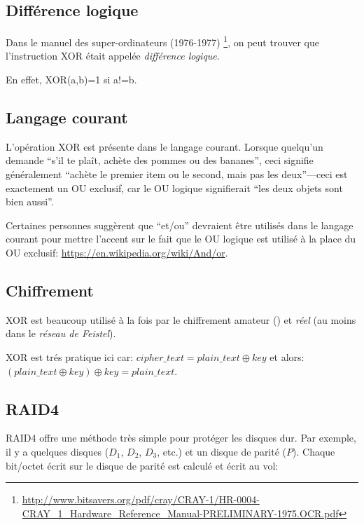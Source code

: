 ﻿
\label{XOR_property}



\subsection{Différence logique}

Dans le manuel des super-ordinateurs (1976-1977)
\footnote{\url{http://www.bitsavers.org/pdf/cray/CRAY-1/HR-0004-CRAY_1_Hardware_Reference_Manual-PRELIMINARY-1975.OCR.pdf}},
on peut trouver que l'instruction XOR était appelée \emph{différence logique}.

En effet, XOR(a,b)=1 si a!=b.

\subsection{Langage courant}

L'opération XOR est présente dans le langage courant.
Lorsque quelqu'un demande ``s'il te plaît, achète des pommes ou des bananes'', ceci
signifie généralement ``achète le premier item ou le second, mais pas les deux''---ceci
est exactement un OU exclusif, car le OU logique signifierait ``les deux objets sont bien aussi''.

Certaines personnes suggèrent que ``et/ou'' devraient être utilisés dans le langage
courant pour mettre l'accent sur le fait que le OU logique est utilisé à la place
du OU exclusif: \url{https://en.wikipedia.org/wiki/And/or}.

\subsection{Chiffrement}

XOR est beaucoup utilisé à la fois par le chiffrement amateur ()
et \emph{réel} (au moins dans le \emph{réseau de Feistel}).

XOR est trés pratique ici car:
$cipher\_text = plain\_text \oplus key$ et alors:
$(plain\_text \oplus key) \oplus key = plain\_text$.

\subsection{\ac{RAID}4}

\ac{RAID}4 offre une méthode très simple pour protéger les disques dur.
Par exemple, il y a quelques disques ($D_1$, $D_2$, $D_3$, etc.) et un disque de
parité ($P$).
Chaque bit/octet écrit sur le disque de parité est calculé et écrit au vol:

